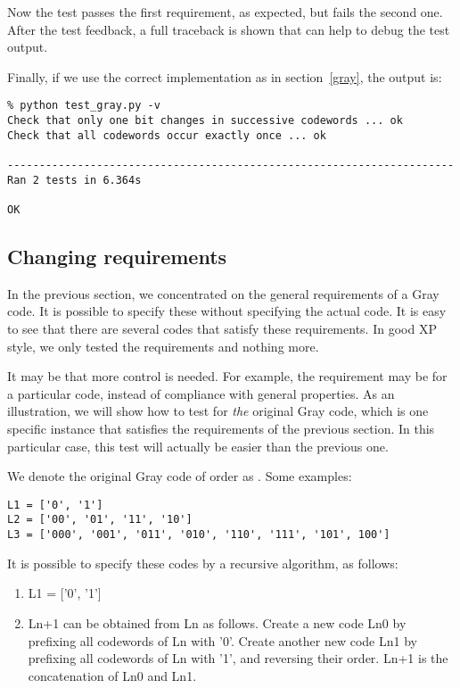 Now the test passes the first requirement, as expected, but fails the
second one. After the test feedback, a full traceback is shown that
can help to debug the test output.

Finally, if we use the correct implementation as in
section~\ref{gray}, the output is:

\begin{verbatim}
% python test_gray.py -v
Check that only one bit changes in successive codewords ... ok
Check that all codewords occur exactly once ... ok

----------------------------------------------------------------------
Ran 2 tests in 6.364s

OK

\end{verbatim}



\subsection{Changing requirements}

In the previous section, we concentrated on the general requirements
of a Gray code. It is possible to specify these without specifying the
actual code. It is easy to see that there are several codes
that satisfy these requirements. In good XP style, we only tested
the requirements and nothing more.

It may be that more control is needed. For example, the requirement
may be for a particular code, instead of compliance with general
properties. As an illustration, we will show how to test for
\emph{the} original Gray code, which is one specific instance that
satisfies the requirements of the previous section. In this particular
case, this test will actually be easier than the previous one.

We denote the original Gray code of order  as . Some
examples: 

\begin{verbatim}
L1 = ['0', '1']
L2 = ['00', '01', '11', '10']
L3 = ['000', '001', '011', '010', '110', '111', '101', 100']

\end{verbatim}

It is possible to specify these codes by a recursive algorithm, as
follows:

\begin{enumerate}
\item L1 = ['0', '1']
\item Ln+1 can be obtained from Ln as follows. Create a new code Ln0 by
prefixing all codewords of Ln with '0'. Create another new code Ln1 by
prefixing all codewords of Ln with '1', and reversing their
order. Ln+1 is the concatenation of Ln0 and Ln1.
\end{enumerate}

